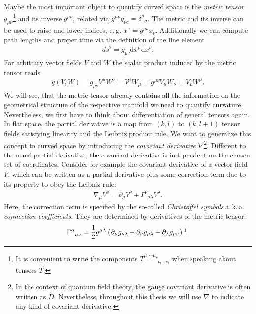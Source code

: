 Maybe the most important object to quantify curved space is the \textit{metric tensor} $g_{\mu\nu}$\footnote{It is convenient to write the components $T_{\phantom{\mu_{1} \cdots \mu_{k}}\nu_{1} \cdots \nu_{l}}^{\mu_{1} \cdots \mu_{k}}$ when speaking about tensors $T$.} and its inverse  $g^{\mu\nu}$, related via $g^{\mu\nu}g_{\nu\sigma} = \delta^{\mu}_{\phantom{\mu}\sigma}$. The metric and its inverse can be used to raise and lower indices, e.\,g. $x^{\mu} = g^{\mu\nu}x_{\nu}$. Additionally we can compute path lengths and proper time via the definition of the line element 
\begin{align}
	d s^{2}=g_{\mu \nu} \mathrm{d} x^{\mu} \mathrm{d} x^{\nu}.
\end{align}
For arbitrary vector fields $V$ and $W$ the scalar product induced by the metric tensor reads
\begin{align}
	g(V,W) = g_{\mu\nu}V^{\mu}W^{\nu} = V^{\mu}W_{\mu}= g^{\mu\nu}V_{\mu}W_{\nu} = V_{\mu}W^{\mu}.
\end{align}
We will see, that the metric tensor already contains all the information on the geometrical structure of the respective manifold we need to quantify curvature. Nevertheless, we first have to think about differentiation of general tensors again. \\
In flat space, the partial derivative is a map from $(k, l)$ to $(k, l+1)$ tensor fields satisfying linearity and the Leibniz product rule. We want to generalize this concept to curved space by introducing the \textit{covariant derivative} $\nabla$\footnote{In the context of quantum field theory, the gauge covariant derivative is often written as $D$. Nevertheless, throughout this thesis we will use $\nabla$ to indicate any kind of covariant derivative.}. Different to the usual partial derivative, the covariant derivative is independent on the chosen set of coordinates. Consider for example the covariant derivative of a vector field $V$, which can be written as a partial derivative plus some correction term due to its property to obey the Leibniz rule:
\begin{align}
\nabla_{\mu} V^{\nu}=\partial_{\mu} V^{\nu}+\Gamma_{\phantom{\nu}\mu \lambda}^{\nu} V^{\lambda}.
\label{eqn:cov_deriv}
\end{align}
Here, the correction term is specified by the so-called \textit{Christoffel symbols} a.\,k.\,a. \textit{connection coefficients}. They are determined by derivatives of the metric tensor:  
\begin{align}
\Gamma_{\phantom{\alpha}\mu \nu}^{\alpha}=\frac{1}{2} g^{\mu \lambda}\left(\partial_{\mu} g_{\nu \lambda}+\partial_{\nu} g_{\mu \lambda}-\partial_{\lambda} g_{\mu \nu}\right)\footnotemark.	
\end{align}
